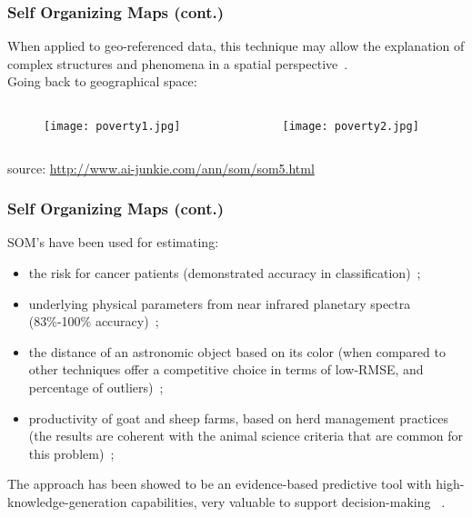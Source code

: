 \documentclass[hyperref={pdfpagelabels=true}]{beamer}
\begin{document}
\begin{frame}
\frametitle{Self Organizing Maps (cont.)}
When applied to geo-referenced data, this technique may allow the
explanation of complex structures and phenomena in a spatial perspective~\cite{gorricha}.\\
\vspace{5mm}
Going back to geographical space:
\begin{columns}
  \begin{column}{5cm}
    \begin{figure}
    \texttt{[image: poverty1.jpg]}
    \end{figure}
  \end{column}
  \begin{column}{5cm}
    \begin{figure}
    \texttt{[image: poverty2.jpg]}
    \end{figure}
  \end{column}
\end{columns}
\tiny{source: \url{http://www.ai-junkie.com/ann/som/som5.html}}\\
\end{frame}

\begin{frame}
\frametitle{Self Organizing Maps (cont.)}
SOM's have been used for estimating:
\begin{itemize}
\item the risk for cancer patients (demonstrated accuracy in classification)~\cite{cancer};
\item underlying physical parameters from near infrared planetary spectra (83\%-100\% accuracy)~\cite{infrared};
\item the distance of an astronomic object based on its color (when compared to other techniques offer a competitive choice in terms of low-RMSE, and percentage of outliers)~\cite{redshift};
\item productivity of goat and sheep farms, based on herd management practices (the results are coherent with the animal science criteria that are common for this problem)~\cite{goat};
\end{itemize}
The approach has been showed to be an evidence-based predictive tool with high-knowledge-generation capabilities, very valuable to support decision-making ~\cite{cancer}.
\end{frame}
\end{document}
